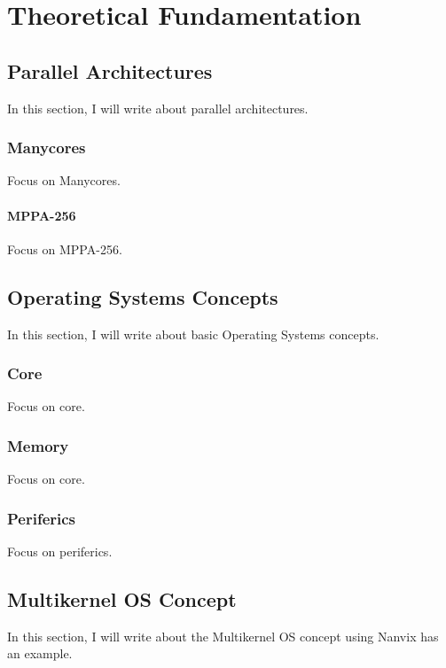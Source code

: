 \chapter{Theoretical Fundamentation} %
\label{ch.fundamentation}

\section{Parallel Architectures}
    In this section, I will write about parallel architectures.

\subsection{Manycores}
    Focus on Manycores.
    
\subsubsection{MPPA-256}
    Focus on MPPA-256.

\section{Operating Systems Concepts}
    In this section, I will write about basic Operating Systems concepts.

\subsection{Core}
    Focus on core.

\subsection{Memory}
    Focus on core.

\subsection{Periferics}
    Focus on periferics.

\section{Multikernel OS Concept}
    In this section, I will write about the Multikernel OS concept using Nanvix has an example.
